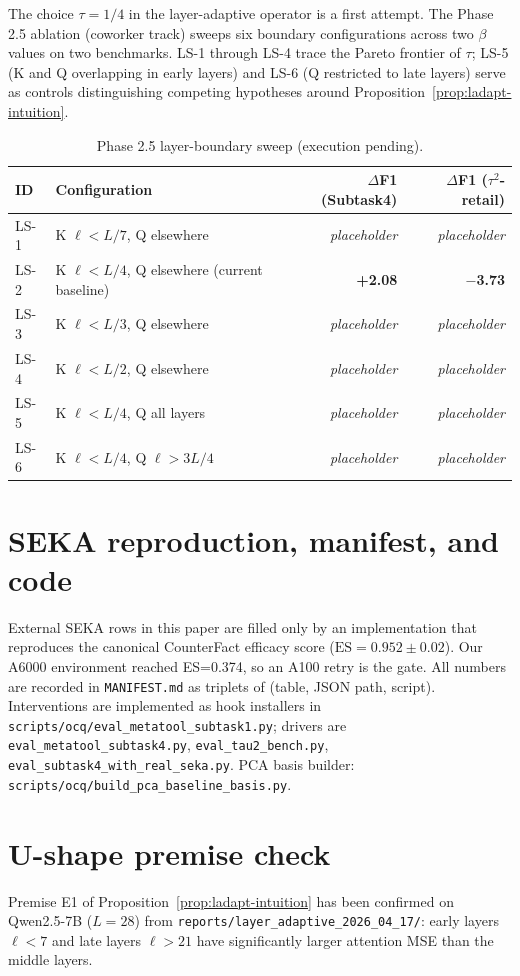 The choice $\tau=1/4$ in the layer-adaptive operator is a first attempt. The Phase 2.5 ablation (coworker track) sweeps six boundary configurations across two $\beta$ values on two benchmarks. LS-1 through LS-4 trace the Pareto frontier of $\tau$; LS-5 (K and Q overlapping in early layers) and LS-6 (Q restricted to late layers) serve as controls distinguishing competing hypotheses around Proposition~\ref{prop:ladapt-intuition}.

\begin{table}[h]
\centering
\caption{Phase 2.5 layer-boundary sweep (execution pending).}
\label{tab:layer-sweep-placeholder}
\small
\begin{tabularx}{\linewidth}{@{}lXrr@{}}
\toprule
ID & Configuration & $\Delta$F1 (Subtask4) & $\Delta$F1 ($\tau^2$-retail) \\
\midrule
LS-1 & K $\ell<L/7$, Q elsewhere & \emph{placeholder} & \emph{placeholder} \\
LS-2 & K $\ell<L/4$, Q elsewhere (current baseline) & \textbf{+2.08} & \textbf{$-$3.73} \\
LS-3 & K $\ell<L/3$, Q elsewhere & \emph{placeholder} & \emph{placeholder} \\
LS-4 & K $\ell<L/2$, Q elsewhere & \emph{placeholder} & \emph{placeholder} \\
LS-5 & K $\ell<L/4$, Q all layers & \emph{placeholder} & \emph{placeholder} \\
LS-6 & K $\ell<L/4$, Q $\ell>3L/4$ & \emph{placeholder} & \emph{placeholder} \\
\bottomrule
\end{tabularx}
\end{table}

\section{SEKA reproduction, manifest, and code}\label{app:seka-repro}\label{app:manifest}

External SEKA rows in this paper are filled only by an implementation that reproduces the canonical CounterFact efficacy score ($\mathrm{ES} = 0.952 \pm 0.02$). Our A6000 environment reached ES=0.374, so an A100 retry is the gate. All numbers are recorded in \texttt{MANIFEST.md} as triplets of (table, JSON path, script). Interventions are implemented as hook installers in \texttt{scripts/ocq/eval\_metatool\_subtask1.py}; drivers are \texttt{eval\_metatool\_subtask4.py}, \texttt{eval\_tau2\_bench.py}, \texttt{eval\_subtask4\_with\_real\_seka.py}. PCA basis builder: \texttt{scripts/ocq/build\_pca\_baseline\_basis.py}.

\section{U-shape premise check}\label{app:ushape}

Premise E1 of Proposition~\ref{prop:ladapt-intuition} has been confirmed on Qwen2.5-7B ($L=28$) from \texttt{reports/layer\_adaptive\_2026\_04\_17/}: early layers $\ell<7$ and late layers $\ell>21$ have significantly larger attention MSE than the middle layers.
